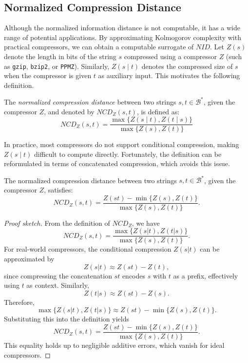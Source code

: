 
\subsection*{Normalized Compression Distance}

Although the normalized information distance is not computable, it has a wide range of potential applications. By approximating Kolmogorov complexity with practical compressors, we can obtain a computable surrogate of $NID$. Let $Z(s)$ denote the length in bits of the string $s$ compressed using a compressor $Z$ (such as \texttt{gzip}, \texttt{bzip2}, or \texttt{PPMZ}). Similarly, $Z(s \mid t)$ denotes the compressed size of $s$ when the compressor is given $t$ as auxiliary input. This motivates the following definition.
 
\begin{definition}
The \emph{normalized compression distance} between two strings $s,  t \in \mathcal{B}^{\ast}$, given the compressor $Z$, and denoted by $NCD_Z(s, t)$, is defined as:
\[
NCD_Z(s, t) = \frac{\max\{ Z(s \mid t), Z(t \mid s) \}}{\max \{ Z(s), Z(t) \} }
\]
\end{definition}

In practice, most compressors do not support conditional compression, making $Z(s \mid t)$ difficult to compute directly. Fortunately, the definition can be reformulated in terms of concatenated compression, which avoids this issue.

\begin{proposition}
The normalized compression distance between two strings $s,  t \in \mathcal{B}^{\ast}$, given the compressor $Z$, satisfies:
\[
NCD_Z(s, t) = \frac{ Z(st) - \min\{ Z(s), Z(t) \}}{\max \{ Z(s), Z(t) \} }.
\]
\end{proposition}
\begin{proof}[Proof sketch]
From the definition of $NCD_Z$, we have
\[
NCD_Z(s,t) = \frac{\max\{Z(s|t), Z(t|s)\}}{\max\{Z(s), Z(t)\}}.
\]
For real-world compressors, the conditional compression $Z(s|t)$ can be approximated by
\[
Z(s|t) \approx Z(st) - Z(t),
\]
since compressing the concatenation $st$ encodes $s$ with $t$ as a prefix, effectively using $t$ as context. Similarly,
\[
Z(t|s) \approx Z(st) - Z(s).
\]
Therefore,
\[
\max\{Z(s|t), Z(t|s)\} \approx Z(st) - \min\{Z(s), Z(t)\}.
\]
Substituting this into the definition yields
\[
NCD_Z(s,t) = \frac{Z(st) - \min\{Z(s), Z(t)\}}{\max\{Z(s), Z(t)\}}.
\]
This equality holds up to negligible additive errors, which vanish for ideal compressors.
\end{proof}

